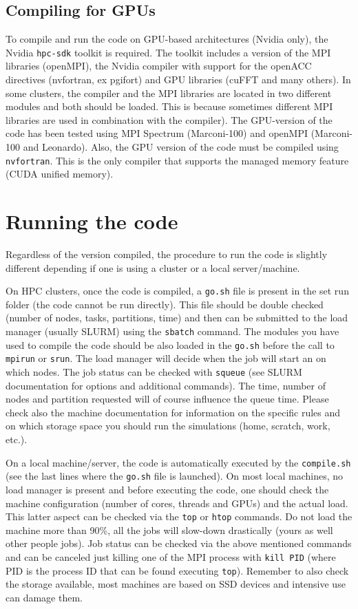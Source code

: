 \subsection{Compiling for GPUs}
To compile and run the code on GPU-based architectures (Nvidia only), the Nvidia \texttt{hpc-sdk} toolkit is required.
The toolkit includes a version of the MPI libraries (openMPI), the Nvidia compiler with support for the openACC directives (nvfortran, ex pgifort) and GPU libraries (cuFFT and many others).
In some clusters, the compiler and the MPI libraries are located in two different modules and both should be loaded.
This is because sometimes different MPI libraries are used in combination with the compiler). 
The GPU-version of the code has been tested using MPI Spectrum (Marconi-100) and openMPI (Marconi-100 and Leonardo).
Also, the GPU version of the code must be compiled using \texttt{nvfortran}.
This is the only compiler that supports the managed memory feature (CUDA unified memory).


\section{Running the code}

Regardless of the version compiled, the procedure to run the code is slightly different depending if one is using a cluster or a local server/machine.

On HPC clusters, once the code is compiled, a \texttt{go.sh} file is present in the set run folder (the code cannot be run directly).
This file should be double checked (number of nodes, tasks, partitions, time) and then can be submitted to the load manager (usually SLURM) using the \texttt{sbatch} command.
The modules you have used to compile the code should be also loaded in the \texttt{go.sh} before the call to \texttt{mpirun} or \texttt{srun}.
The load manager will decide when the job will start an on which nodes.
The job status can be checked with \texttt{squeue} (see SLURM documentation for options and additional commands).
The time, number of nodes and partition requested will of course influence the queue time.
Please check also the machine documentation for information on the specific rules and on which storage space you should run the simulations (home, scratch, work, etc.).

On a local machine/server, the code is automatically executed by the \texttt{compile.sh} (see the last lines where the \texttt{go.sh} file is launched).
On most local machines, no load manager is present and before executing the code, one should check the machine configuration (number of cores, threads and GPUs) and the actual load.
This latter aspect can be checked via the \texttt{top} or \texttt{htop} commands.
Do not load the machine more than 90\%, all the jobs will slow-down drastically (yours as well other people jobs).
Job status can be checked via the above mentioned commands and can be canceled just killing one of the MPI process with \texttt{kill PID} (where PID is the process ID that can be found executing \texttt{top}).
Remember to also check the storage available, most machines are based on SSD devices and intensive use can damage them.




